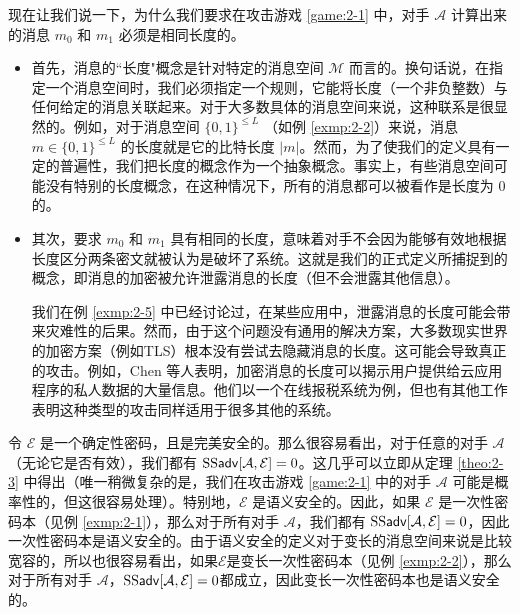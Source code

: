 \begin{remark}
现在让我们说一下，为什么我们要求在攻击游戏 \ref{game:2-1} 中，对手 $\mathcal{A}$ 计算出来的消息 $m_0$ 和 $m_1$ 必须是相同长度的。
\begin{itemize}
	\item 首先，消息的``长度"概念是针对特定的消息空间 $\mathcal{M}$ 而言的。换句话说，在指定一个消息空间时，我们必须指定一个规则，它能将长度（一个非负整数）与任何给定的消息关联起来。对于大多数具体的消息空间来说，这种联系是很显然的。例如，对于消息空间 $\{0, 1\}^{\leq L}$ （如例 \ref{exmp:2-2}）来说，消息 $m\in\{0, 1\}^{\leq L}$ 的长度就是它的比特长度 $|m|$。然而，为了使我们的定义具有一定的普遍性，我们把长度的概念作为一个抽象概念。事实上，有些消息空间可能没有特别的长度概念，在这种情况下，所有的消息都可以被看作是长度为 $0$ 的。
	\item 其次，要求 $m_0$ 和 $m_1$ 具有相同的长度，意味着对手不会因为能够有效地根据长度区分两条密文就被认为是破坏了系统。这就是我们的正式定义所捕捉到的概念，即消息的加密被允许泄露消息的长度（但不会泄露其他信息）。
		
	我们在例 \ref{exmp:2-5} 中已经讨论过，在某些应用中，泄露消息的长度可能会带来灾难性的后果。然而，由于这个问题没有通用的解决方案，大多数现实世界的加密方案（例如TLS）根本没有尝试去隐藏消息的长度。这可能会导致真正的攻击。例如，Chen 等人表明，加密消息的长度可以揭示用户提供给云应用程序的私人数据的大量信息。他们以一个在线报税系统为例，但也有其他工作表明这种类型的攻击同样适用于很多其他的系统。
\end{itemize}
\end{remark}

\begin{example}\label{exmp:2-9}
令 $\mathcal{E}$ 是一个确定性密码，且是完美安全的。那么很容易看出，对于任意的对手 $\mathcal{A}$（无论它是否有效），我们都有 ${\rm SS\mathsf{adv}}[\mathcal{A},\mathcal{E}]=0$。这几乎可以立即从定理 \ref{theo:2-3} 中得出（唯一稍微复杂的是，我们在攻击游戏 \ref{game:2-1} 中的对手 $\mathcal{A}$ 可能是概率性的，但这很容易处理）。特别地，$\mathcal{E}$ 是语义安全的。因此，如果 $\mathcal{E}$ 是一次性密码本（见例 \ref{exmp:2-1}），那么对于所有对手 $\mathcal{A}$，我们都有 ${\rm SS\mathsf{adv}}[\mathcal{A},\mathcal{E}]=0$，因此一次性密码本是语义安全的。由于语义安全的定义对于变长的消息空间来说是比较宽容的，所以也很容易看出，如果$\mathcal{E}$是变长一次性密码本（见例 \ref{exmp:2-2}），那么对于所有对手 $\mathcal{A}$，${\rm SS\mathsf{adv}}[\mathcal{A},\mathcal{E}]=0$都成立，因此变长一次性密码本也是语义安全的。
\end{example}

